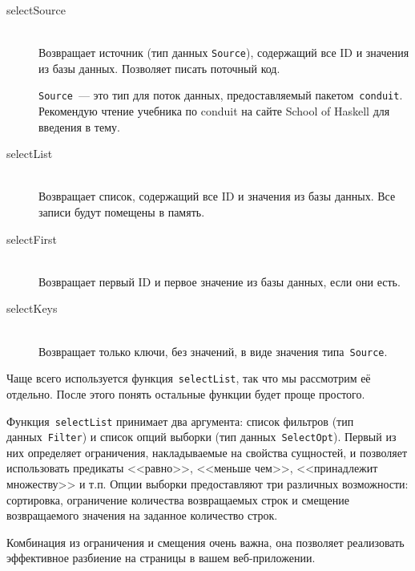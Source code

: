 \begin{description}
    \item[selectSource] \hfill \\
        Возвращает источник (тип данных \lstinline'Source'), содержащий все ID
        и значения из базы данных. Позволяет писать поточный код.

    \begin{remark}
        \lstinline'Source'~--- это тип для поток данных, предоставляемый
        пакетом~\texttt{conduit}. Рекомендую чтение
        {учебника по conduit на сайте School of Haskell} для введения в тему.
    \end{remark}

    \item[selectList] \hfill\\
        Возвращает список, содержащий все ID и значения из базы данных. Все
        записи будут помещены в память.

    \item[selectFirst] \hfill \\
        Возвращает первый ID и первое значение из базы данных, если они есть.

    \item[selectKeys] \hfill \\
        Возвращает только ключи, без значений, в виде значения
        типа~\lstinline'Source'.
\end{description}

Чаще всего используется функция~\lstinline'selectList', так что мы рассмотрим
её отдельно. После этого понять остальные функции будет проще простого.

Функция~\lstinline'selectList' принимает два аргумента: список фильтров (тип
данных~\lstinline'Filter') и список опций выборки (тип
данных~\lstinline'SelectOpt'). Первый из них определяет ограничения,
накладываемые на свойства сущностей, и позволяет использовать предикаты
<<равно>>, <<меньше чем>>, <<принадлежит множеству>> и т.п. Опции выборки
предоставляют три различных возможности: сортировка, ограничение количества
возвращаемых строк и смещение возвращаемого значения на заданное количество
строк.

\begin{remark}
    Комбинация из ограничения и смещения очень важна, она позволяет реализовать
    эффективное разбиение на страницы в вашем веб-приложении.
\end{remark}


